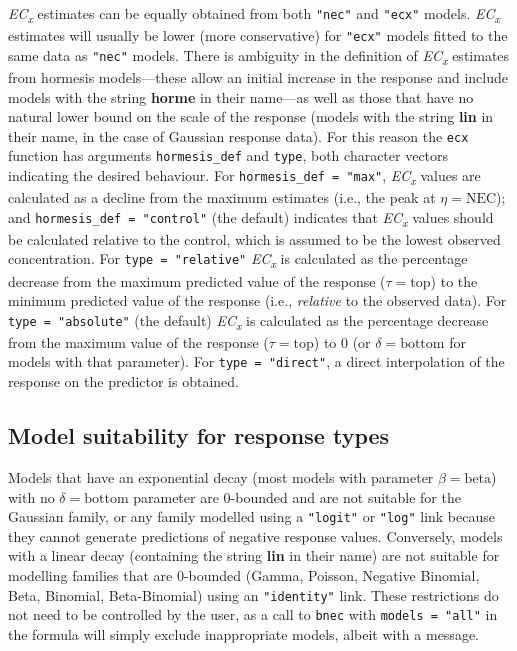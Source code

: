 \emph{EC\textsubscript{x}} estimates can be equally obtained from both
\texttt{"nec"} and \texttt{"ecx"} models. \emph{EC\textsubscript{x}}
estimates will usually be lower (more conservative) for \texttt{"ecx"}
models fitted to the same data as \texttt{"nec"} models. There is
ambiguity in the definition of \emph{EC\textsubscript{x}} estimates from
hormesis models---these allow an initial increase in the response
\citep[see][]{Mattson2008} and include models with the string
\textbf{horme} in their name---as well as those that have no natural
lower bound on the scale of the response (models with the string
\textbf{lin} in their name, in the case of Gaussian response data). For
this reason the \texttt{ecx} function has arguments
\texttt{hormesis\_def} and \texttt{type}, both character vectors
indicating the desired behaviour. For \texttt{hormesis\_def\ =\ "max"},
\emph{EC\textsubscript{x}} values are calculated as a decline from the
maximum estimates (i.e., the peak at \(\eta = \text{NEC}\)); and
\texttt{hormesis\_def\ =\ "control"} (the default) indicates that
\emph{EC\textsubscript{x}} values should be calculated relative to the
control, which is assumed to be the lowest observed concentration. For
\texttt{type\ =\ "relative"} \emph{EC\textsubscript{x}} is calculated as
the percentage decrease from the maximum predicted value of the response
(\(\tau = \text{top}\)) to the minimum predicted value of the response
(i.e., \emph{relative} to the observed data). For
\texttt{type\ =\ "absolute"} (the default) \emph{EC\textsubscript{x}} is
calculated as the percentage decrease from the maximum value of the
response (\(\tau = \text{top}\)) to 0 (or \(\delta = \text{bottom}\) for
models with that parameter). For \texttt{type\ =\ "direct"}, a direct
interpolation of the response on the predictor is obtained.

\hypertarget{model-suitability-for-response-types}{%
\subsection{Model suitability for response
types}\label{model-suitability-for-response-types}}

Models that have an exponential decay (most models with parameter
\(\beta = \text{beta}\)) with no \(\delta = \text{bottom}\) parameter
are 0-bounded and are not suitable for the Gaussian family, or any
family modelled using a \texttt{"logit"} or \texttt{"log"} link because
they cannot generate predictions of negative response values.
Conversely, models with a linear decay (containing the string
\textbf{lin} in their name) are not suitable for modelling families that
are 0-bounded (Gamma, Poisson, Negative Binomial, Beta, Binomial,
Beta-Binomial) using an \texttt{"identity"} link. These restrictions do
not need to be controlled by the user, as a call to \texttt{bnec} with
\texttt{models\ =\ "all"} in the formula will simply exclude
inappropriate models, albeit with a message.

